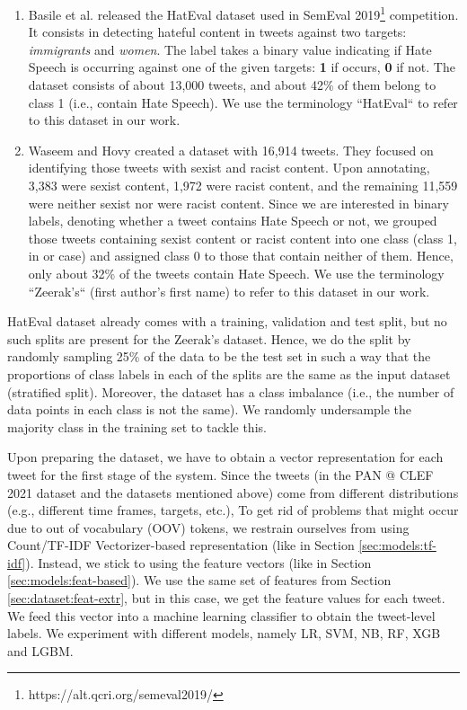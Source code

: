 \begin{enumerate}
    \item Basile et al. released the HatEval dataset \cite{hateval} used in SemEval 2019\footnote{https://alt.qcri.org/semeval2019/} competition. It consists in detecting hateful content in tweets against two targets: \emph{immigrants} and \emph{women}. The label takes a binary value indicating if Hate Speech is occurring against one of the given targets: \textbf{1} if occurs, \textbf{0} if not. The dataset consists of about 13,000 tweets, and about 42\% of them belong to class 1 (i.e., contain Hate Speech). We use the terminology ``HatEval`` to refer to this dataset in our work.
    
    \item Waseem and Hovy created a dataset \cite{zeerak} with 16,914 tweets. They focused on identifying those tweets with sexist and racist content. Upon annotating, 3,383 were sexist content, 1,972 were racist content, and the remaining 11,559 were neither sexist nor were racist content. Since we are interested in binary labels, denoting whether a tweet contains Hate Speech or not, we grouped those tweets containing sexist content or racist content into one class (class 1, in or case) and assigned class 0 to those that contain neither of them. Hence, only about 32\% of the tweets contain Hate Speech. We use the terminology ``Zeerak's`` (first author's first name) to refer to this dataset in our work.
\end{enumerate}

HatEval dataset already comes with a training, validation and test split, but no such splits are present for the Zeerak's dataset. Hence, we do the split by randomly sampling 25\% of the data to be the test set in such a way that the proportions of class labels in each of the splits are the same as the input dataset (stratified split). Moreover, the dataset has a class imbalance (i.e., the number of data points in each class is not the same). We randomly undersample the majority class in the training set to tackle this. 


Upon preparing the dataset, we have to obtain a vector representation for each tweet for the first stage of the system. Since the tweets (in the PAN @ CLEF 2021 dataset and the datasets mentioned above) come from different distributions (e.g., different time frames, targets, etc.), To get rid of problems that might occur due to out of vocabulary (OOV) tokens, we restrain ourselves from using Count/\ac{TF-IDF} Vectorizer-based representation (like in Section \ref{sec:models:tf-idf}). Instead, we stick to using the feature vectors (like in Section \ref{sec:models:feat-based}). We use the same set of features from Section \ref{sec:dataset:feat-extr}, but in this case, we get the feature values for each tweet. We feed this vector into a machine learning classifier to obtain the tweet-level labels. We experiment with different models, namely \ac{LR}, \ac{SVM}, \ac{NB}, \ac{RF}, \ac{XGB} and \ac{LGBM}.

